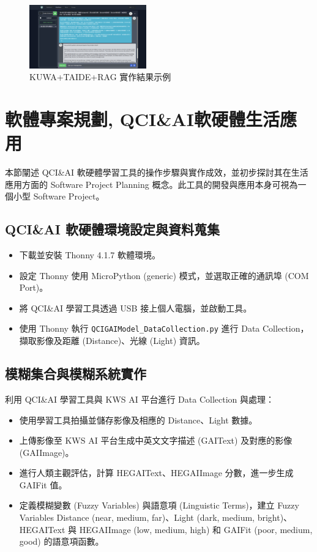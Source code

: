 \documentclass[twocolumn,11pt,a4paper]{article}
\begin{document}
\begin{figure}[htbp]
    \centering
    \includegraphics[width=0.45\textwidth]{res/image/taide_chat.png} %
    \caption{KUWA+TAIDE+RAG 實作結果示例}
    \label{fig:kuwa_rag_result}
\end{figure}
\FloatBarrier

\section{軟體專案規劃, QCI\&AI軟硬體生活應用}
本節闡述 QCI\&AI 軟硬體學習工具的操作步驟與實作成效，並初步探討其在生活應用方面的 Software Project Planning 概念。此工具的開發與應用本身可視為一個小型 Software Project。

\subsection{QCI\&AI 軟硬體環境設定與資料蒐集}
\begin{itemize}
    \item 下載並安裝 Thonny 4.1.7 軟體環境。
    \item 設定 Thonny 使用 MicroPython (generic) 模式，並選取正確的通訊埠 (COM Port)。
    \item 將 QCI\&AI 學習工具透過 USB 接上個人電腦，並啟動工具。
    \item 使用 Thonny 執行 \texttt{QCIGAIModel\_DataCollection.py} 進行 Data Collection，擷取影像及距離 (Distance)、光線 (Light) 資訊。
\end{itemize}

\subsection{模糊集合與模糊系統實作}
利用 QCI\&AI 學習工具與 KWS AI 平台進行 Data Collection 與處理：
\begin{itemize}
    \item 使用學習工具拍攝並儲存影像及相應的 Distance、Light 數據。
    \item 上傳影像至 KWS AI 平台生成中英文文字描述 (GAIText) 及對應的影像 (GAIImage)。
    \item 進行人類主觀評估，計算 HEGAIText、HEGAIImage 分數，進一步生成 GAIFit 值。
    \item 定義模糊變數 (Fuzzy Variables) 與語意項 (Linguistic Terms)，建立 Fuzzy Variables Distance (near, medium, far)、Light (dark, medium, bright)、HEGAIText 與 HEGAIImage (low, medium, high) 和 GAIFit (poor, medium, good) 的語意項函數。
\end{itemize}
\end{document}
